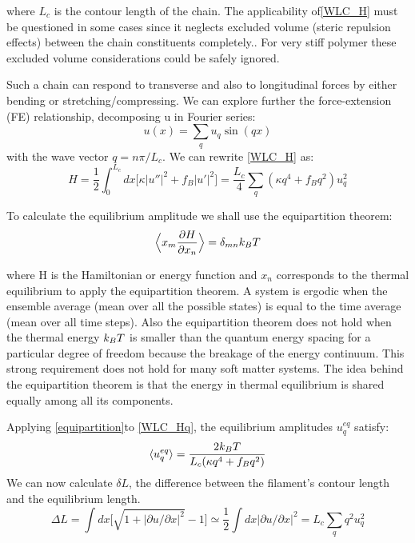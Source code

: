 where $L_c$ is the contour length of the chain.
The applicability of\ref{WLC_H} must be questioned in some cases since it
neglects excluded volume (steric repulsion effects) between the
chain constituents completely.\citet{hsu_breakdown_2011}. For very stiff polymer
these excluded volume considerations could be safely ignored.

Such a chain can respond to transverse and also to longitudinal forces by either
bending or stretching/compressing. We can explore further the force-extension
(FE) relationship, decomposing u in Fourier series:
\begin{equation}\label{WLC_ufourier}
u(x)=\sum_q u_q \sin(qx)
\end{equation}
with the wave vector $q=n\pi/L_c$. We can rewrite \ref{WLC_H} as:
\begin{equation}\label{WLC_Hq}
H=\frac{1}{2}\int_0^{L_c} dx\Big[\kappa|u''|^2 + f_B|u'|^2\Big] =
\frac{L_c}{4}\sum_q (\kappa q^4 + f_Bq^2)u_q^2
\end{equation}

To calculate the equilibrium amplitude we shall use the equipartition theorem:
\begin{equation}\label{equipartition}
\Big\langle x_m\frac{\partial H}{\partial x_n} \Big\rangle= \delta_{mn}k_B{}T
\end{equation}

where H is the Hamiltonian or energy function and $x_n$ corresponds to the
thermal equilibrium to apply the equipartition theorem. A system is ergodic when
the ensemble average (mean over all the possible states) is equal to the time average (mean over all time
steps). Also the equipartition theorem does not hold when the
thermal energy $k_B{}T$ is smaller than the quantum energy spacing for a
particular degree of freedom because the breakage of the energy continuum. This
strong requirement does not hold for many soft matter systems. The idea behind
the equipartition theorem is that the energy in thermal equilibrium is shared
equally among all its components.

Applying \ref{equipartition}to \ref{WLC_Hq}, the equilibrium amplitudes
$u_q^{eq} $ satisfy:
\begin{equation}\label{equipartition_uq}
\langle u_q^{eq}\rangle=\frac{2k_B{}T}{L_c(\kappa{}q^4+f_Bq^2)}
\end{equation}
We can now calculate $\delta L$, the difference between the filament's contour
length and the equilibrium length.
\begin{equation}\label{deltaL}
\Delta L= \int dx \Big[ \sqrt{1+|\partial u/\partial x|^2} -1\Big]\simeq
\frac{1}{2} \int dx |\partial u/\partial x|^2 = L_c \sum_q q^2 u_q^2
\end{equation}

